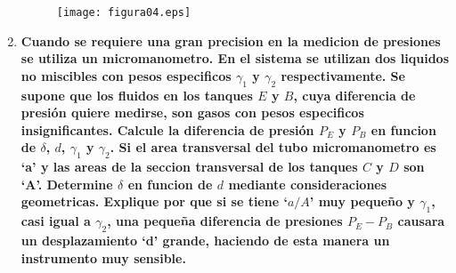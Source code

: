 \documentclass[letter,11pt]{article}
\begin{document}
\begin{enumerate}
\begin{figure}[!h]
\centering
\texttt{[image: figura04.eps]}
\end{figure}

\item \textbf{Cuando se requiere una gran precision en la medicion de presiones
se utiliza un micromanometro. En el sistema se utilizan dos liquidos no
miscibles con pesos especificos $\gamma_1$ y $\gamma_2$ respectivamente. Se
supone que los fluidos en los tanques $E$ y $B$, cuya diferencia de presión
quiere medirse, son gasos con pesos especificos insignificantes. Calcule la
diferencia de presión $P_E$ y $P_B$ en funcion de $\delta$, $d$, $\gamma_1$ y
$\gamma_2$. Si el area transversal del tubo micromanometro es `a' y las areas de
la seccion transversal de los tanques $C$ y $D$ son `A'. Determine $\delta$ en
funcion de $d$ mediante consideraciones geometricas. Explique por que si se
tiene `$a/A$' muy pequeño y $\gamma_1$, casi igual a $\gamma_2$, una pequeña
diferencia de presiones $P_E-P_B$ causara un desplazamiento `d' grande, haciendo
de esta manera un instrumento muy sensible.}

\end{enumerate}
\end{document}
